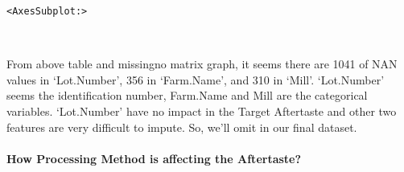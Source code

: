 \documentclass[11pt]{article}
\makeatletter
\newcommand{\boxspacing}{\kern\kvtcb@left@rule\kern\kvtcb@boxsep}
\newcommand{\prompt}[4]{
        {\ttfamily\llap{{\color{#2}[#3]:\hspace{3pt}#4}}\vspace{-\baselineskip}}
    }
\makeatother
\begin{document}
            \begin{tcolorbox}[breakable, size=fbox, boxrule=.5pt, pad at break*=1mm, opacityfill=0]
\prompt{Out}{outcolor}{5}{\boxspacing}
\begin{Verbatim}[commandchars=\\\{\}]
<AxesSubplot:>
\end{Verbatim}
\end{tcolorbox}
        
    \begin{center}
    \end{center}
    { \hspace*{\fill} \\}
    
    From above table and missingno matrix graph, it seems there are 1041 of
NAN values in `Lot.Number', 356 in `Farm.Name', and 310 in `Mill'.
`Lot.Number' seems the identification number, Farm.Name and Mill are the
categorical variables. `Lot.Number' have no impact in the Target
Aftertaste and other two features are very difficult to impute. So,
we'll omit in our final dataset.

    \hypertarget{how-processing-method-is-affecting-the-aftertaste}{%
\paragraph{How Processing Method is affecting the
Aftertaste?}\label{how-processing-method-is-affecting-the-aftertaste}}
\end{document}
